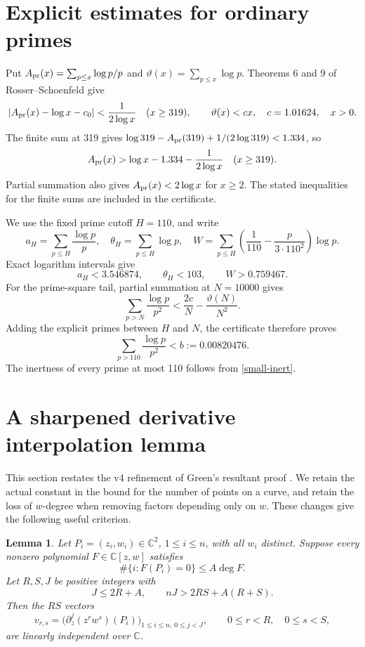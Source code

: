 \documentclass[11pt]{article}
\newtheorem{lemma}[theorem]{Lemma}
\newcommand{\C}{\mathbb C}
\begin{document}
\section{Explicit estimates for ordinary primes}\label{primes}

Put \(A_{\rm pr}(x)=\sum_{p\le x}\log p/p\) and
\(\vartheta(x)=\sum_{p\le x}\log p\). Theorems 6 and 9 of
Rosser--Schoenfeld \cite{rs} give
\[
 |A_{\rm pr}(x)-\log x-c_0|<\frac1{2\log x}\quad(x\ge319),
 \qquad \vartheta(x)<cx,\quad c=1.01624,\quad x>0.
\]
The finite sum at 319 gives
\(\log319-A_{\rm pr}(319)+1/(2\log319)<1.334\), so
\begin{equation}\label{prime-total}
 A_{\rm pr}(x)>\log x-1.334-\frac1{2\log x}\quad(x\ge319).
\end{equation}
Partial summation also gives \(A_{\rm pr}(x)<2\log x\) for \(x\ge2\).
The stated inequalities for the finite sums are included in the
certificate.

We use the fixed prime cutoff \(H=110\), and write
\[
 a_H=\sum_{p\le H}\frac{\log p}{p},\quad
 \theta_H=\sum_{p\le H}\log p,\quad
 W=\sum_{p\le H}\left(\frac1{110}-\frac{p}{3\cdot110^2}\right)\log p.
\]
Exact logarithm intervals give
\begin{equation}\label{prime-constants}
 a_H<3.546874,\qquad \theta_H<103,\qquad W>0.759467.
\end{equation}
For the prime-square tail, partial summation at \(N=10000\) gives
\[
 \sum_{p>N}\frac{\log p}{p^2}
 <\frac{2c}{N}-\frac{\vartheta(N)}{N^2}.
\]
Adding the explicit primes between \(H\) and \(N\), the certificate
therefore proves
\begin{equation}\label{prime-tail}
 \sum_{p>110}\frac{\log p}{p^2}<b:=0.00820476.
\end{equation}
The inertness of every prime at most 110 follows from
\eqref{small-inert}.

\section{A sharpened derivative interpolation lemma}\label{rank}

This section restates the v4 refinement of Green's resultant proof \cite{green,v4}. We retain the
actual constant in the bound for the number of points on a curve, and
retain the loss of \(w\)-degree when removing factors depending only on
\(w\). These changes give the following useful criterion.

\begin{lemma}\label{rank-lemma}
Let \(P_i=(z_i,w_i)\in\C^2\), \(1\le i\le n\), with all \(w_i\)
distinct. Suppose every nonzero polynomial \(F\in\C[z,w]\) satisfies
\[
 \#\{i:F(P_i)=0\}\le A\deg F.
\]
Let \(R,S,J\) be positive integers with
\begin{equation}\label{rank-condition}
 J\le2R+A,\qquad nJ>2RS+A(R+S).
\end{equation}
Then the \(RS\) vectors
\[
 v_{r,s}=\bigl(\partial_z^j(z^r w^s)(P_i)\bigr)_{
                 1\le i\le n,\ 0\le j<J},
 \qquad0\le r<R,\quad0\le s<S,
\]
are linearly independent over \(\C\).
\end{lemma}
\end{document}
